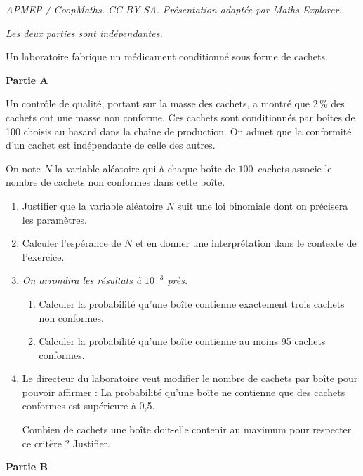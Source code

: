 \documentclass[10pt]{article}
\begin{document}
\noindent\textit{APMEP / CoopMaths. CC BY-SA. Présentation adaptée par Maths Explorer.}\par\medskip
\medskip

\textit{Les deux parties sont indépendantes.}

\smallskip

Un laboratoire fabrique un médicament conditionné sous forme de cachets.

\begin{center}
\textbf{Partie A}
\end{center}

Un contrôle de qualité, portant sur la masse des cachets, a montré que 2\,\% des cachets ont une masse non conforme. Ces cachets sont conditionnés par boîtes de 100 choisis au hasard dans la chaîne de production. On admet que la conformité d'un cachet est indépendante de celle des autres.

\smallskip

On note $N$ la variable aléatoire qui à chaque boîte de $100$~cachets associe le nombre de cachets non conformes dans cette boîte.

\begin{enumerate}
	\item Justifier que la variable aléatoire $N$ suit une loi binomiale dont on précisera les paramètres.
	\item Calculer l'espérance de $N$ et en donner une interprétation dans le contexte de l'exercice.
	\item \textit{On arrondira les résultats à $10^{-3}$ près.}
	\begin{enumerate}
		\item Calculer la probabilité qu'une boîte contienne exactement trois cachets non
		conformes.
		\item Calculer la probabilité qu'une boîte contienne au moins 95 cachets conformes.
	\end{enumerate}
	\item Le directeur du laboratoire veut modifier le nombre de cachets par boîte pour pouvoir affirmer : \og La probabilité qu'une boîte ne contienne que des cachets conformes est supérieure à 0,5\fg.
	
Combien de cachets une boîte doit-elle contenir au maximum pour respecter ce critère ? Justifier.
\end{enumerate}

\begin{center}
	\textbf{Partie B}
\end{center}
\end{document}
